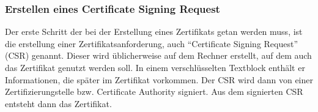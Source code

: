         \subsubsection{Erstellen eines Certificate Signing Request}
          Der erste Schritt der bei der Erstellung eines Zertifikats getan
          werden muss, ist die erstellung einer Zertifikatsanforderung, auch
          \enquote{Certificate Signing Request} (CSR) genannt. Dieser wird
          üblicherweise auf dem Rechner erstellt, auf dem auch das Zertifikat
          genutzt werden soll. In einem verschlüsselten Textblock enthält er
          Informationen, die später im Zertifikat vorkommen. Der CSR wird dann
          von einer Zertifizierungstelle bzw. Certificate Authority signiert.
          Aus dem signierten CSR entsteht dann das Zertifikat.
          \begin{literaturinternet}
            \item \cite{sslshopwiaccsr}
          \end{literaturinternet}
